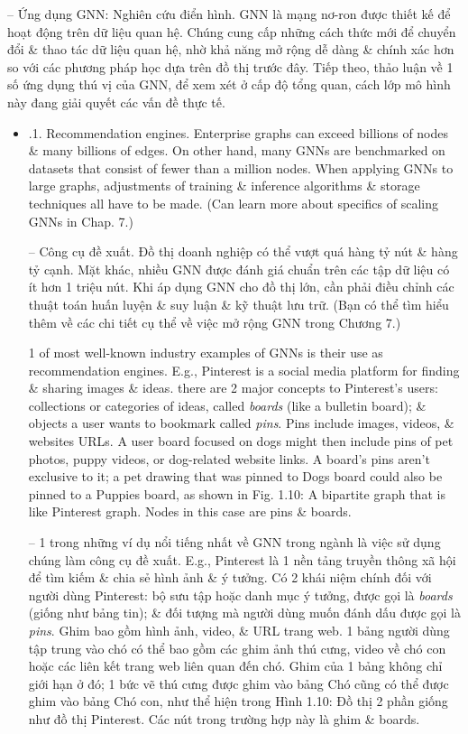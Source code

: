 \documentclass{article}
\begin{document}
\begin{itemize}
\begin{itemize}
        -- {\sf Ứng dụng GNN: Nghiên cứu điển hình.} GNN là mạng nơ-ron được thiết kế để hoạt động trên dữ liệu quan hệ. Chúng cung cấp những cách thức mới để chuyển đổi \& thao tác dữ liệu quan hệ, nhờ khả năng mở rộng dễ dàng \& chính xác hơn so với các phương pháp học dựa trên đồ thị trước đây. Tiếp theo, thảo luận về 1 số ứng dụng thú vị của GNN, để xem xét ở cấp độ tổng quan, cách lớp mô hình này đang giải quyết các vấn đề thực tế.
        \begin{itemize}
            \item {.1. Recommendation engines.} Enterprise graphs can exceed billions of nodes \& many billions of edges. On other hand, many GNNs are benchmarked on datasets that consist of fewer than a million nodes. When applying GNNs to large graphs, adjustments of training \& inference algorithms \& storage techniques all have to be made. (Can learn more about specifics of scaling GNNs in Chap. 7.)

            -- {\sf Công cụ đề xuất.} Đồ thị doanh nghiệp có thể vượt quá hàng tỷ nút \& hàng tỷ cạnh. Mặt khác, nhiều GNN được đánh giá chuẩn trên các tập dữ liệu có ít hơn 1 triệu nút. Khi áp dụng GNN cho đồ thị lớn, cần phải điều chỉnh các thuật toán huấn luyện \& suy luận \& kỹ thuật lưu trữ. (Bạn có thể tìm hiểu thêm về các chi tiết cụ thể về việc mở rộng GNN trong Chương 7.)

            1 of most well-known industry examples of GNNs is their use as recommendation engines. E.g., Pinterest is a social media platform for finding \& sharing images \& ideas. there are 2 major concepts to Pinterest's users: collections or categories of ideas, called {\it boards}  (like a bulletin board); \& objects a user wants to bookmark called {\it pins}. Pins include images, videos, \& websites URLs. A user board focused on dogs might then include pins of pet photos, puppy videos, or dog-related website links. A board's pins aren't exclusive to it; a pet drawing that was pinned to Dogs board could also be pinned to a Puppies board, as shown in {\sf Fig. 1.10: A bipartite graph that is like Pinterest graph. Nodes in this case are pins \& boards}.

            -- 1 trong những ví dụ nổi tiếng nhất về GNN trong ngành là việc sử dụng chúng làm công cụ đề xuất. E.g., Pinterest là 1 nền tảng truyền thông xã hội để tìm kiếm \& chia sẻ hình ảnh \& ý tưởng. Có 2 khái niệm chính đối với người dùng Pinterest: bộ sưu tập hoặc danh mục ý tưởng, được gọi là {\it boards} (giống như bảng tin); \& đối tượng mà người dùng muốn đánh dấu được gọi là {\it pins}. Ghim bao gồm hình ảnh, video, \& URL trang web. 1 bảng người dùng tập trung vào chó có thể bao gồm các ghim ảnh thú cưng, video về chó con hoặc các liên kết trang web liên quan đến chó. Ghim của 1 bảng không chỉ giới hạn ở đó; 1 bức vẽ thú cưng được ghim vào bảng Chó cũng có thể được ghim vào bảng Chó con, như thể hiện trong {\sf Hình 1.10: Đồ thị 2 phần giống như đồ thị Pinterest. Các nút trong trường hợp này là ghim \& boards}.


\end{itemize}
\end{itemize}
\end{itemize}
\end{document}
